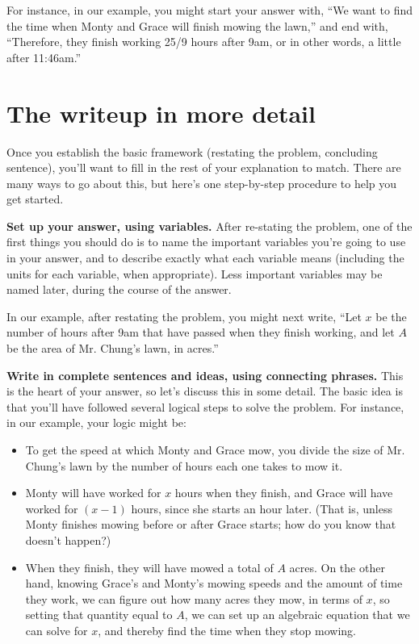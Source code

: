 \documentclass{article}
\begin{document}
For instance, in our example, you might start your answer with, ``We want to find the time when Monty and Grace will finish mowing the lawn,'' and end with, ``Therefore, they finish working 25/9 hours after 9am, or in other words, a little after 11:46am.''

\section*{The writeup in more detail}

Once you establish the basic framework (restating the problem, concluding sentence), you'll want to fill in the rest of your explanation to match. There are many ways to go about this, but here's one step-by-step procedure to help you get started.

\textbf{Set up your answer, using variables.} After re-stating the problem, one of the first things you should do is to name the important variables you're going to use in your answer, and to describe exactly what each variable means (including the units for each variable, when appropriate). Less important variables may be named later, during the course of the answer.

In our example, after restating the problem, you might next write, ``Let $x$ be the number of hours after 9am that have passed when they finish working, and let $A$ be the area of Mr. Chung's lawn, in acres.''

\textbf{Write in complete sentences and ideas, using connecting phrases.} This is the heart of your answer, so let's discuss this in some detail. The basic idea is that you'll have followed several logical steps to solve the problem. For instance, in our example, your logic might be:

\begin{itemize}

\item To get the speed at which Monty and Grace mow, you divide the size of Mr. Chung's lawn by the number of hours each one takes to mow it.

\item Monty will have worked for $x$ hours when they finish, and Grace will have worked for $(x − 1)$ hours, since she starts an hour later. (That is, unless Monty finishes mowing before or after Grace starts; how do you know that doesn’t happen?)

\item When they finish, they will have mowed a total of $A$ acres. On the other hand, knowing Grace's and Monty's mowing speeds and the amount of time they work, we can figure out how many acres they mow, in terms of $x$, so setting that quantity equal to $A$, we can set up an algebraic equation that we can solve for $x$, and thereby find the time when they stop mowing.

\end{itemize}
\end{document}
